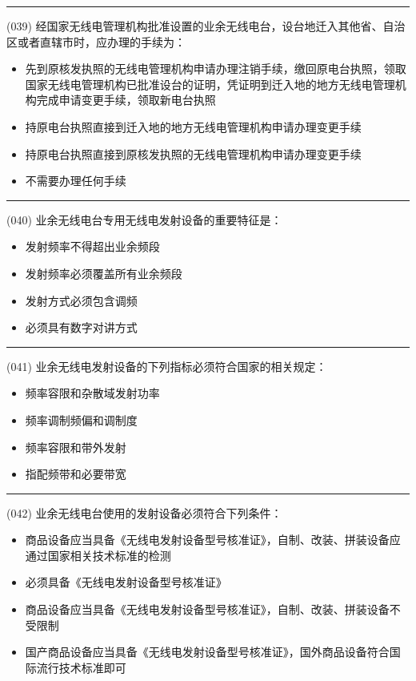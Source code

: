 \documentclass[twocolumn]{ctexart}  %
\begin{document}
\noindent\rule{0.5\textwidth}{1pt}
\heiti (039) 经国家无线电管理机构批准设置的业余无线电台，设台地迁入其他省、自治区或者直辖市时，应办理的手续为： \songti {\color{gray} [LK0090] }
\begin{itemize}
	\item  先到原核发执照的无线电管理机构申请办理注销手续，缴回原电台执照，领取国家无线电管理机构已批准设台的证明，凭证明到迁入地的地方无线电管理机构完成申请变更手续，领取新电台执照
	\item  持原电台执照直接到迁入地的地方无线电管理机构申请办理变更手续
	\item  持原电台执照直接到原核发执照的无线电管理机构申请办理变更手续
	\item  不需要办理任何手续
\end{itemize}


\noindent\rule{0.5\textwidth}{1pt}
\heiti (040) 业余无线电台专用无线电发射设备的重要特征是： \songti {\color{gray} [LK0024] }
\begin{itemize}
	\item  发射频率不得超出业余频段
	\item  发射频率必须覆盖所有业余频段
	\item  发射方式必须包含调频
	\item  必须具有数字对讲方式
\end{itemize}


\noindent\rule{0.5\textwidth}{1pt}
\heiti (041) 业余无线电发射设备的下列指标必须符合国家的相关规定： \songti {\color{gray} [LK0025] }
\begin{itemize}
	\item  频率容限和杂散域发射功率
	\item  频率调制频偏和调制度
	\item  频率容限和带外发射
	\item  指配频带和必要带宽
\end{itemize}


\noindent\rule{0.5\textwidth}{1pt}
\heiti (042) 业余无线电台使用的发射设备必须符合下列条件： \songti {\color{gray} [LK0038] }
\begin{itemize}
	\item  商品设备应当具备《无线电发射设备型号核准证》，自制、改装、拼装设备应通过国家相关技术标准的检测
	\item  必须具备《无线电发射设备型号核准证》
	\item  商品设备应当具备《无线电发射设备型号核准证》，自制、改装、拼装设备不受限制
	\item  国产商品设备应当具备《无线电发射设备型号核准证》，国外商品设备符合国际流行技术标准即可
\end{itemize}
\end{document}
